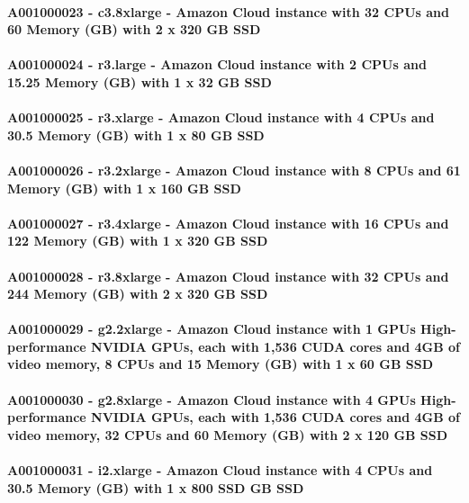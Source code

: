 \documentclass{acm_proc_article-sp}
\begin{document}
\paragraph{A001000023 - c3.8xlarge - Amazon Cloud instance with 32 CPUs and 60 Memory (GB) with 2 x 320 GB SSD}
\paragraph{A001000024 - r3.large - Amazon Cloud instance with 2 CPUs and 15.25 Memory (GB) with 1 x 32 GB SSD}
\paragraph{A001000025 - r3.xlarge - Amazon Cloud instance with 4 CPUs and 30.5 Memory (GB) with 1 x 80 GB SSD}
\paragraph{A001000026 - r3.2xlarge - Amazon Cloud instance with 8 CPUs and 61 Memory (GB) with 1 x 160 GB SSD}
\paragraph{A001000027 - r3.4xlarge - Amazon Cloud instance with 16 CPUs and 122 Memory (GB) with 1 x 320 GB SSD}
\paragraph{A001000028 - r3.8xlarge - Amazon Cloud instance with 32 CPUs and 244 Memory (GB) with 2 x 320 GB SSD}
\paragraph{A001000029 - g2.2xlarge - Amazon Cloud instance with 1 GPUs High-performance NVIDIA GPUs, each with 1,536 CUDA cores and 4GB of video memory, 8 CPUs and 15 Memory (GB) with 1 x 60 GB SSD}
\paragraph{A001000030 - g2.8xlarge - Amazon Cloud instance with 4 GPUs High-performance NVIDIA GPUs, each with 1,536 CUDA cores and 4GB of video memory, 32 CPUs and 60 Memory (GB) with 2 x 120 GB SSD}
\paragraph{A001000031 - i2.xlarge - Amazon Cloud instance with 4 CPUs and 30.5 Memory (GB) with 1 x 800 SSD GB SSD}
\end{document}
